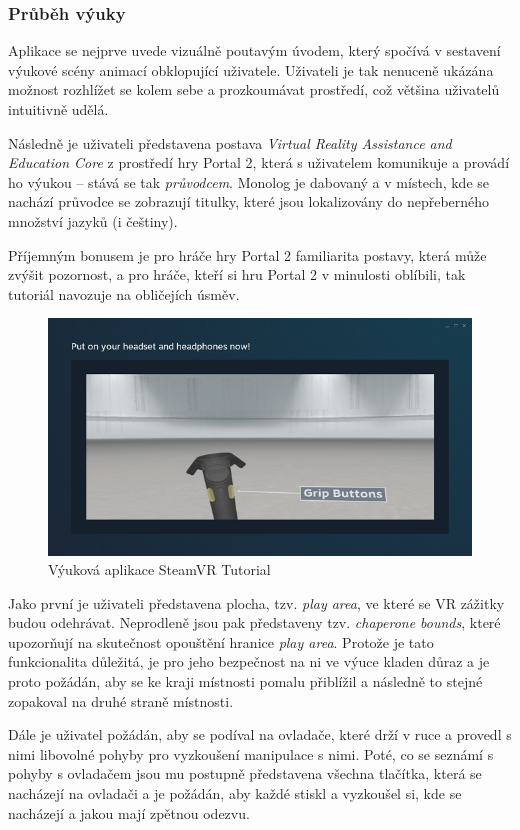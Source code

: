 \subsubsection{Průběh výuky}\label{prux16fbux11bh-vuxfduky}

Aplikace se nejprve uvede vizuálně poutavým úvodem, který spočívá v
sestavení výukové scény animací obklopující uživatele. Uživateli je tak nenuceně
ukázána možnost rozhlížet se kolem sebe a prozkoumávat prostředí, což
většina uživatelů intuitivně udělá.

Následně je uživateli představena postava \emph{Virtual Reality
Assistance and Education Core} z prostředí hry Portal 2, která s uživatelem
komunikuje a provádí ho výukou -- stává se tak \emph{průvodcem}. Monolog
je dabovaný a v místech, kde se nachází průvodce se zobrazují titulky,
které jsou lokalizovány do nepřeberného množství jazyků (i češtiny).

Příjemným bonusem je pro hráče hry Portal 2 familiarita postavy, která
může zvýšit pozornost, a pro hráče, kteří si hru Portal 2 v
minulosti oblíbili, tak tutoriál navozuje na obličejích úsměv.

\begin{figure}[h!]
\centering
\includegraphics[width=12cm]{src/assets/steamvr-tutorial.png}
\caption{Výuková aplikace SteamVR Tutorial}
\end{figure}

Jako první je uživateli představena plocha, tzv. \emph{play area}, ve
které se VR zážitky budou odehrávat. Neprodleně jsou pak představeny
tzv. \emph{chaperone bounds}, které upozorňují na skutečnost opouštění 
hranice \emph{play area}. Protože je tato funkcionalita
důležitá, je pro jeho bezpečnost na ni ve výuce kladen důraz a je proto
požádán, aby se ke kraji místnosti pomalu přiblížil a následně to stejné
zopakoval na druhé straně místnosti.

Dále je uživatel požádán, aby se podíval na ovladače, které drží v ruce
a provedl s nimi libovolné pohyby pro vyzkoušení manipulace s nimi.
Poté, co se seznámí s pohyby s ovladačem jsou mu postupně představena
všechna tlačítka, která se nacházejí na ovladači a je požádán, aby každé
stiskl a vyzkoušel si, kde se nacházejí a jakou mají zpětnou odezvu.

